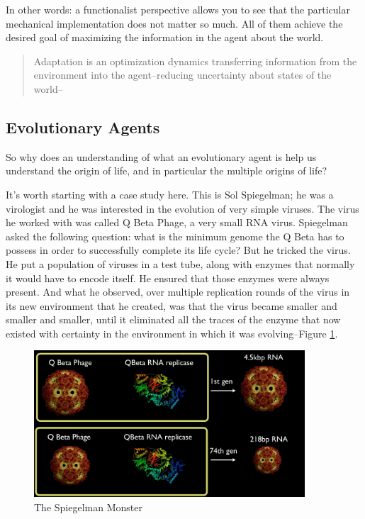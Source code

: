 \documentclass[]{article}
\begin{document}
In other words: a functionalist perspective allows you to see
that the particular mechanical implementation does not matter so much.
All of them achieve the desired goal of maximizing the information in the agent about the world.

\begin{quotation}
	Adaptation is an optimization dynamics transferring information from the environment into the agent--reducing uncertainty about states of the world--\cite{rockmore2018cultural}
\end{quotation}

\subsection{Evolutionary Agents}
So why does an understanding of what an evolutionary agent is help us understand the origin of life, and in particular the multiple origins of life?

It's worth starting with a case study here.
This is Sol Spiegelman; he was a virologist and he was interested in the evolution of very simple viruses.
The virus he worked with was called Q Beta Phage,  a very small RNA virus.
Spiegelman asked the following question: what is the minimum genome the Q Beta has to possess in order to successfully complete its life cycle? But he tricked the virus.
He put a population of viruses in a test tube, along with enzymes that normally it would have to encode itself.
He ensured that those enzymes were always present.
And what he observed, over multiple replication rounds of the virus in its new environment that he created, was that the virus became smaller and smaller and smaller,
until it eliminated all the traces of the enzyme that now existed with certainty in the environment in which it was evolving--Figure \ref{fig:SpiegelmanMonster}. 
\begin{figure}[H]
	\caption{The Spiegelman Monster}\label{fig:SpiegelmanMonster}
	\includegraphics[width=0.9\textwidth]{SpiegelmanMonster}
\end{figure}
\end{document}

